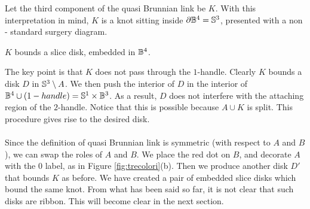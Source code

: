 Let the third component of the quasi Brunnian link be $K$.
With this interpretation in mind, $K$ is a knot sitting inside $\partial \mathbb{B}^4 = \mathbb{S}^3$, presented with a non - standard surgery diagram. 
\begin{cla}$K$ bounds a slice disk, embedded in $\mathbb{B}^4$.
\end{cla}
The key point is that $K$ does not pass through the $1$-handle.
Clearly $K$ bounds a disk $D$ in $\mathbb{S}^3 \setminus A$. We then push the interior of $D$ in the interior of $\mathbb{B}^4 \cup (1-handle) = \mathbb{S}^1 \times \mathbb{B}^3$.
As a result, $D$ does not interfere with the attaching region of the $2$-handle.
Notice that this is possible because $A \cup K$ is split.
This procedure gives rise to the desired disk. \\ \\
Since the definition of quasi Brunnian link is symmetric (with respect to $A$ and $B$), we can swap the roles of $A$ and $B$. We place the red dot on $B$, and decorate $A$ with the $0$ label, as in Figure \ref{fig:trecolori}(b). Then we produce another disk $D'$ that bounds $K$ as before. We have created a pair of embedded slice disks which bound the same knot. 
From what has been said so far, it is not clear that such disks are ribbon.
This will become clear in the next section.

